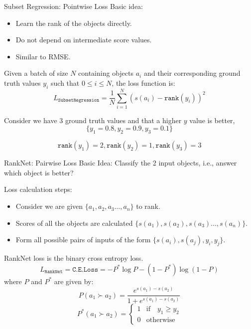 \documentclass{beamer}
\begin{document}
\begin{frame}[t]{Subset Regression: Pointwise Loss}
Basic idea:~\cite{subsetregressionpaper}
\begin{itemize}
\item Learn the rank of the objects directly.
\item Do not depend on intermediate score values.
\item Similar to RMSE.
\end{itemize}

Given a batch of size $N$ containing objects $a_i$ and their corresponding ground truth values $y_i$ such that $0 \leq i \leq N$,  the loss function is:
$$
L_{\texttt{SubsetRegression}} = \frac{1}{N} \sum\limits_{i=1}^{N} (s(a_i) - \texttt{rank}(y_i))^2
$$

Consider we have 3 ground truth values and that a higher $y$ value is better, 
$$
\{y_1 = 0.8, y_2 = 0.9, y_3 = 0.1\}
$$

$$
\texttt{rank}(y_1) = 2,  \texttt{rank}(y_2) = 1,  \texttt{rank}(y_3) = 3
$$

\end{frame}

\begin{frame}[t]{RankNet: Pairwise Loss}
Basic Idea: Classify the 2 input objects, i.e., answer which object is better?~\cite{ranknetpaper}

Loss calculation steps:
\begin{itemize}
\item Consider we are given $\{a_1, a_2, a_3..., a_n\}$ to rank.
\item Scores of all the objects are calculated $\{s(a_1), s(a_2), s(a_3)..., s(a_n)\}$.
\item Form all possible pairs of inputs of the form $\{s(a_i), s(a_j), y_i, y_j\}$.
\end{itemize}

RankNet loss is the binary cross entropy loss.
$$
L_{\texttt{RankNet}} = \texttt{C.E.Loss} = -P^*\log P - (1 - P^*)\log(1-P)
$$
where $P$ and $P^*$ are given by:
$$
P(a_1 \succ a_2) = \frac{e^{s(a_1) - s(a_2)}}{1 + e^{s(a_1) - s(a_2)} }
$$
$$
P^*(a_1 \succ a_2) =
\begin{cases}
      1 & \text{if} \quad y_1 \geq y_2 \\
      0 &  \text{otherwise}
\end{cases}       
$$

\end{frame}
\end{document}
